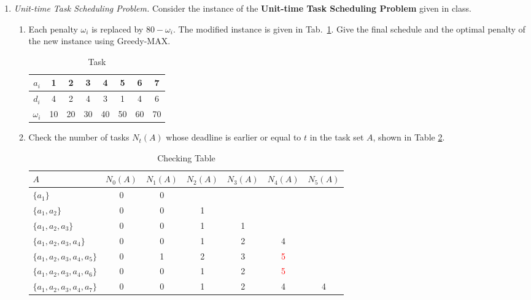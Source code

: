 \documentclass[12pt,a4paper]{article}
\makeatletter
\newtheorem*{solution}{Solution}
\theoremstyle{definition}
\renewenvironment{solution}[1][Solution] {\par\pushQED{\qed}\normalfont\topsep6\p@\@plus6\p@\relax\trivlist\item[\hskip\labelsep\bfseries#1\@addpunct{.}]\ignorespaces}{\popQED\endtrivlist\@endpefalse} \makeatother
\makeatother
\begin{document}
\begin{enumerate}
\begin{enumerate}
\begin{solution}
	\end{solution}

\end{enumerate}
\item \textit{Unit-time Task Scheduling Problem.} Consider the instance of the \textbf{Unit-time Task Scheduling Problem} given in class. 
    \begin{enumerate}
        \item Each penalty $\omega_{i}$ is replaced by $80-\omega_{i}$. The modified instance is given in Tab.~\ref{tab:1}. Give the final schedule and the optimal penalty of the new instance using Greedy-MAX.
		\begin{table}[H]
			\setlength{\abovecaptionskip}{0.cm}
			\setlength{\belowcaptionskip}{0.5cm}
			\centering
			\caption{Task}
			\label{tab:1}			
			\begin{tabular}{|c|ccccccc|}
				\hline
				$ a_{i} $&1&2&3&4&5&6&7\\
				\hline
				$ d_{i} $&4&2&4&3&1&4&6\\
                \hline
                $ \omega_{i} $&10&20&30&40&50&60&70\\
				\hline
			\end{tabular}
		\end{table}
		\begin{solution}
			Check the number of tasks $N_t(A)$ whose deadline is earlier or equal to $t$ in the task set $A$, shown in Table \ref{tab:ct}.
			\begin{table}[h]
			\centering
			\caption{Checking Table}
			\label{tab:ct}
			\begin{tabular}{|l|cccccc|}
				\hline
				$A$ & $N_0(A)$ & $N_1(A)$ & $N_2(A)$ & $N_3(A)$ & $N_4(A)$ & $N_5(A)$\\
				\hline
				$\{a_1\}$ & 0 & 0 & & & & \\
				$\{a_1,a_2\}$ & 0 & 0 & 1 & & & \\
				$\{a_1,a_2,a_3\}$ & 0 & 0 & 1 & 1 & & \\
				$\{a_1,a_2,a_3,a_4\}$ & 0 & 0 & 1 & 2 & 4 & \\
				\textcolor{gray!50}{$\{a_1,a_2,a_3,a_4,a_5\}$} & 0 & 1 & 2 & 3 & \textcolor{red}{5} & \\
				\textcolor{gray!50}{$\{a_1,a_2,a_3,a_4,a_6\}$} & 0 & 0 & 1 & 2 & \textcolor{red}{5} & \\
				$\{a_1,a_2,a_3,a_4,a_7\}$ & 0 & 0 & 1 & 2 & 4 & 4\\
				\hline
			\end{tabular}
			\end{table}


\end{solution}
\end{enumerate}
\end{enumerate}
\end{document}
